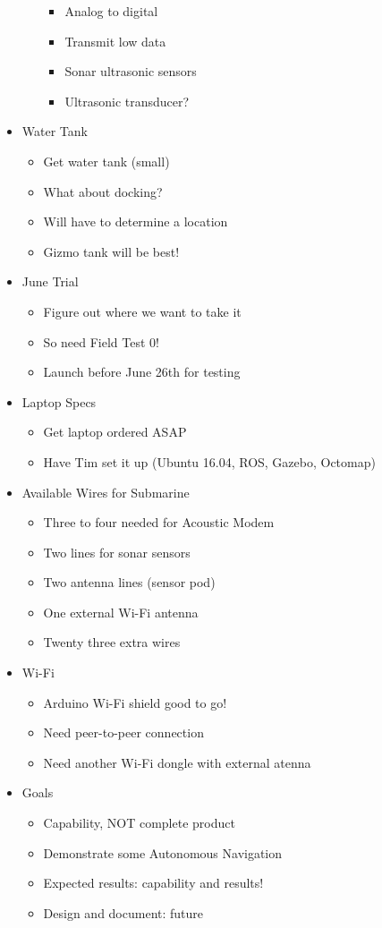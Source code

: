 \documentclass[12pt]{article}
\begin{document}
\begin{itemize}
\begin{itemize}
\begin{itemize}
						\item Analog to digital
						\item Transmit low data
						\item Sonar ultrasonic sensors
						\item Ultrasonic transducer?
					\end{itemize}
				\end{itemize}
				\item Water Tank
				\begin{itemize}
					\item Get water tank (small)
					\item What about docking?
					\item Will have to determine a location 
					\item Gizmo tank will be best!
				\end{itemize}
				\item June Trial
				\begin{itemize}
					\item Figure out where we want to take it
					\item So need Field Test 0!
					\item Launch before June 26th for testing
				\end{itemize}
				\item Laptop Specs
				\begin{itemize}
					\item Get laptop ordered ASAP
					\item Have Tim set it up (Ubuntu 16.04, ROS, Gazebo, Octomap)
				\end{itemize}
				\item Available Wires for Submarine
				\begin{itemize}
					\item Three to four needed for Acoustic Modem
					\item Two lines for sonar sensors
					\item Two antenna lines (sensor pod)
					\item One external Wi-Fi antenna
					\item Twenty three extra wires
				\end{itemize}
				\item Wi-Fi
				\begin{itemize}
					\item Arduino Wi-Fi shield good to go!
					\item Need peer-to-peer connection
					\item Need another Wi-Fi dongle with external atenna
				\end{itemize}
				\item Goals
				\begin{itemize}
					\item Capability, NOT complete product
					\item Demonstrate some Autonomous Navigation
					\item Expected results: capability and results! 
					\item Design and document: future
				\end{itemize}
			\end{itemize}
		
\end{document}
